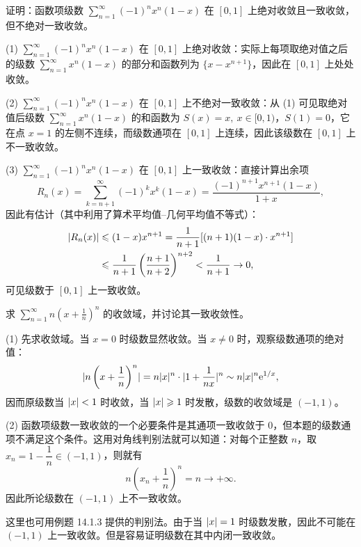 \begin{xexample}[14.1.5]
证明：函数项级数 $\displaystyle\sum_{n=1}^{\infty}(-1)^n x^n(1-x)$ 在 $[0,1]$ 上绝对收敛且一致收敛，但不绝对一致收敛。
\end{xexample}
\begin{xproof}
(1) $\displaystyle\sum_{n=1}^{\infty}(-1)^n x^n(1-x)$ 在 $[0,1]$ 上绝对收敛：实际上每项取绝对值之后的级数 $\displaystyle\sum_{n=1}^{\infty}x^n(1-x)$ 的部分和函数列为 $\{x-x^{n+1}\}$，因此在 $[0,1]$ 上处处收敛。

(2) $\displaystyle\sum_{n=1}^{\infty}(-1)^n x^n(1-x)$ 在 $[0,1]$ 上不绝对一致收敛：从 (1) 可见取绝对值后级数 $\displaystyle\sum_{n=1}^{\infty}x^n(1-x)$ 的和函数为 $S(x)=x,\ x\in[0,1)$，$S(1)=0$，它在点 $x=1$ 的左侧不连续，而级数通项在 $[0,1]$ 上连续，因此该级数在 $[0,1]$ 上不一致收敛。

(3) $\displaystyle\sum_{n=1}^{\infty}(-1)^n x^n(1-x)$ 在 $[0,1]$ 上一致收敛：直接计算出余项
\[
  R_n(x)=\sum_{k=n+1}^{\infty}(-1)^k x^k(1-x)=\frac{(-1)^{n+1}x^{n+1}(1-x)}{1+x},
\]
因此有估计（其中利用了算术平均值--几何平均值不等式）：
\[
\begin{aligned}
  \lvert R_n(x)\rvert&\leqslant(1-x)x^{n+1}
  =\frac1{n+1}[(n+1)(1-x)\cdot x^{n+1}]\\
  &\leqslant\frac1{n+1}\left(\frac{n+1}{n+2}\right)^{n+2}
  <\frac1{n+1}\to0,
\end{aligned}
\]
可见级数于 $[0,1]$ 上一致收敛。
\end{xproof}

\begin{xexample}[14.1.6]
求 $\displaystyle\sum_{n=1}^{\infty}n\left(x+\frac1n\right)^n$ 的收敛域，并讨论其一致收敛性。
\end{xexample}
\begin{xsolution}
(1) 先求收敛域。当 $x=0$ 时级数显然收敛。当 $x\ne0$ 时，观察级数通项的绝对值：
\[
  \lvert n\left(x+\frac1n\right)^n\rvert
  =n\lvert x\rvert^n\cdot\lvert1+\frac1{nx}\rvert^n\sim n\lvert x\rvert^n\mathrm{e}^{1/x},
\]
因而原级数当 $\lvert x\rvert<1$ 时收敛，当 $\lvert x\rvert\geqslant1$ 时发散，级数的收敛域是 $(-1,1)$。

(2) 函数项级数一致收敛的一个必要条件是其通项一致收敛于 $0$，但本题的级数通项不满足这个条件。这用对角线判别法就可以知道：对每个正整数 $n$，取 $x_n=1-\dfrac1n\in(-1,1)$，则就有
\[
  n\left(x_n+\frac1n\right)^n=n\to+\infty.
\]
因此所论级数在 $(-1,1)$ 上不一致收敛。
\end{xsolution}

\begin{xremark}
这里也可用例题 14.1.3 提供的判别法。由于当 $\lvert x\rvert=1$ 时级数发散，因此不可能在 $(-1,1)$ 上一致收敛。但是容易证明级数在其中内闭一致收敛。
\end{xremark}

